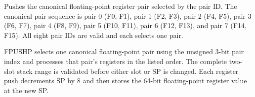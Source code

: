 Pushes the canonical floating-point register pair selected by the pair ID. The canonical pair sequence is pair 0 (F0, F1), pair 1 (F2, F3), pair 2 (F4, F5), pair 3 (F6, F7), pair 4 (F8, F9), pair 5 (F10, F11), pair 6 (F12, F13), and pair 7 (F14, F15). All eight pair IDs are valid and each selects one pair.

FPUSHP selects one canonical floating-point pair using the unsigned 3-bit pair index and processes that pair's registers in the listed order. The complete two-slot stack range is validated before either slot or SP is changed. Each register push decrements SP by 8 and then stores the 64-bit floating-point register value at the new SP.
